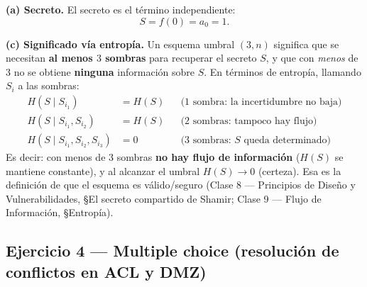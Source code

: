 \medskip
\textbf{(a) Secreto.} El secreto es el término independiente:
\begin{equation}
  S = f(0) = a_0 = \boxed{1}.
\end{equation}

\medskip
\textbf{(c) Significado vía entropía.} Un esquema umbral $(3,n)$ significa que se necesitan
\textbf{al menos $3$ sombras} para recuperar el secreto $S$, y que con \emph{menos} de $3$ no
se obtiene \textbf{ninguna} información sobre $S$. En términos de entropía, llamando $S_i$ a
las sombras:
\begin{align*}
  H(S \mid S_{i_1}) &= H(S) && \text{(1 sombra: la incertidumbre no baja)}\\
  H(S \mid S_{i_1}, S_{i_2}) &= H(S) && \text{(2 sombras: tampoco hay flujo)}\\
  H(S \mid S_{i_1}, S_{i_2}, S_{i_3}) &= 0 && \text{(3 sombras: $S$ queda determinado)}
\end{align*}
Es decir: con menos de $3$ sombras \textbf{no hay flujo de información} ($H(S)$ se mantiene
constante), y al alcanzar el umbral $H(S)\to 0$ (certeza). Esa es la definición de que el
esquema es válido/seguro (Clase 8 — Principios de Diseño y Vulnerabilidades, \S El secreto
compartido de Shamir; Clase 9 — Flujo de Información, \S Entropía).

\subsection{Ejercicio 4 — Multiple choice (resolución de conflictos en ACL y DMZ)}

